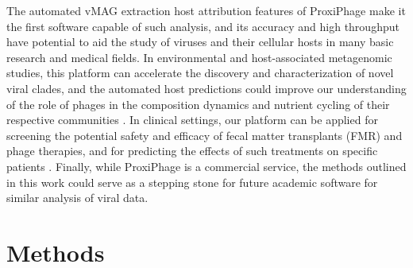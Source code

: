 The automated vMAG extraction host attribution features of ProxiPhage make it the first software capable of such analysis, and its accuracy and high throughput have potential to aid the study of viruses and their cellular hosts in many basic research and medical fields. In environmental and host-associated metagenomic studies, this platform can accelerate the discovery and characterization of novel viral clades, and the automated host predictions could improve our understanding of the role of phages in the composition dynamics and nutrient cycling of their respective communities \cite{RN2994}. In clinical settings, our platform can be applied for screening the potential safety and efficacy of fecal matter transplants (FMR) and phage therapies, and for predicting the effects of such treatments on specific patients \cite{RN2995, RN2997}. Finally, while ProxiPhage is a commercial service, the methods outlined in this work could serve as a stepping stone for future academic software for similar analysis of viral data. 




\section*{Methods}

